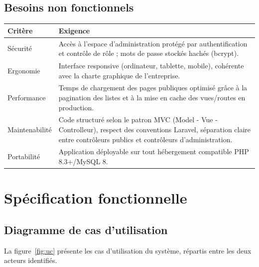 \documentclass[11pt,a4paper]{report}
\begin{document}
\section{Besoins non fonctionnels}

\begin{center}
\renewcommand{\arraystretch}{1.3}
\begin{tabular}{L{3cm} L{10.5cm}}
\toprule
{}
\textbf{Critère} & \textbf{Exigence} \\
\midrule
Sécurité & Accès à l'espace d'administration protégé par authentification et
contrôle de rôle ; mots de passe stockés hachés (bcrypt). \\
\addlinespace
Ergonomie & Interface responsive (ordinateur, tablette, mobile), cohérente
avec la charte graphique de l'entreprise. \\
\addlinespace
Performance & Temps de chargement des pages publiques optimisé grâce à la
pagination des listes et à la mise en cache des vues/routes en production. \\
\addlinespace
Maintenabilité & Code structuré selon le patron MVC (Model - Vue - Controlleur), respect des conventions
Laravel, séparation claire entre contrôleurs publics et contrôleurs
d'administration. \\
\addlinespace
Portabilité & Application déployable sur tout hébergement compatible PHP
8.3+/MySQL 8. \\
\bottomrule
\end{tabular}
\end{center}

\chapter{Spécification fonctionnelle}

\section{Diagramme de cas d'utilisation}

La figure~\ref{fig:uc} présente les cas d'utilisation du système, répartis
entre les deux acteurs identifiés.
\end{document}
